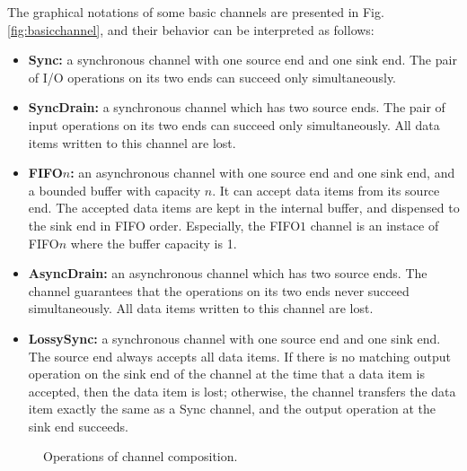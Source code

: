 \documentclass{llncs}
\begin{document}
The graphical notations of some basic channels are presented in Fig. \ref{fig:basicchannel}, and their behavior can be interpreted as follows:
\begin{itemize}
\item{\textbf{Sync:} a synchronous channel with one source end and one sink end. The pair of I/O operations on its two ends can succeed only simultaneously.}
\item{\textbf{SyncDrain:} a synchronous channel which has two source ends.
 The pair of input operations on its two ends can succeed only simultaneously.
 All data items written to this channel are lost.}
\item{\textbf{FIFO$n$:} an asynchronous channel with one source end and one sink end, and a bounded buffer with capacity $n$.
It can accept data items from its source end. The accepted data items are kept in the internal buffer, and dispensed to
the sink end in FIFO order.
Especially, the FIFO$1$ channel is an instace of FIFO$n$ where the buffer capacity is 1.}
\item{\textbf{AsyncDrain:}  an asynchronous channel} which has two source ends. The channel guarantees that the operations on its two ends never succeed simultaneously. All data items written to this channel are lost.
\item{\textbf{LossySync:} a synchronous channel with one source end
    and one sink end. The source end always accepts all data items. If
    there is no matching output operation on the sink end of the
    channel at the time that a data item is accepted, then the data
    item is lost; otherwise, the channel transfers the data item
    exactly the same as a Sync channel, and the output operation at the sink end succeeds.}
\end{itemize}

\begin{figure}
\centering
{}
\caption{Operations of channel composition.}\label{fig:channelcomposition}
\end{figure}
\end{document}
